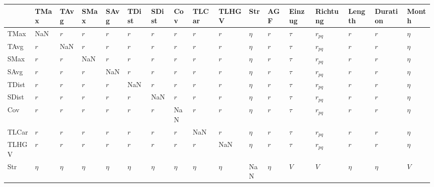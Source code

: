 \begin{tabular}{lllllllllllllllll}
\toprule
{} &      TMax &      TAvg &      SMax &      SAvg &     TDist &     SDist &       Cov &     TLCar &     TLHGV &     Str &       AGF &  Einzug &  Richtung &    Length &  Duration &   Month \\
\midrule
TMax     &       NaN &       $r$ &       $r$ &       $r$ &       $r$ &       $r$ &       $r$ &       $r$ &       $r$ &  $\eta$ &       $r$ &  $\tau$ &  $r_{pq}$ &       $r$ &       $r$ &  $\eta$ \\
TAvg     &       $r$ &       NaN &       $r$ &       $r$ &       $r$ &       $r$ &       $r$ &       $r$ &       $r$ &  $\eta$ &       $r$ &  $\tau$ &  $r_{pq}$ &       $r$ &       $r$ &  $\eta$ \\
SMax     &       $r$ &       $r$ &       NaN &       $r$ &       $r$ &       $r$ &       $r$ &       $r$ &       $r$ &  $\eta$ &       $r$ &  $\tau$ &  $r_{pq}$ &       $r$ &       $r$ &  $\eta$ \\
SAvg     &       $r$ &       $r$ &       $r$ &       NaN &       $r$ &       $r$ &       $r$ &       $r$ &       $r$ &  $\eta$ &       $r$ &  $\tau$ &  $r_{pq}$ &       $r$ &       $r$ &  $\eta$ \\
TDist    &       $r$ &       $r$ &       $r$ &       $r$ &       NaN &       $r$ &       $r$ &       $r$ &       $r$ &  $\eta$ &       $r$ &  $\tau$ &  $r_{pq}$ &       $r$ &       $r$ &  $\eta$ \\
SDist    &       $r$ &       $r$ &       $r$ &       $r$ &       $r$ &       NaN &       $r$ &       $r$ &       $r$ &  $\eta$ &       $r$ &  $\tau$ &  $r_{pq}$ &       $r$ &       $r$ &  $\eta$ \\
Cov      &       $r$ &       $r$ &       $r$ &       $r$ &       $r$ &       $r$ &       NaN &       $r$ &       $r$ &  $\eta$ &       $r$ &  $\tau$ &  $r_{pq}$ &       $r$ &       $r$ &  $\eta$ \\
TLCar    &       $r$ &       $r$ &       $r$ &       $r$ &       $r$ &       $r$ &       $r$ &       NaN &       $r$ &  $\eta$ &       $r$ &  $\tau$ &  $r_{pq}$ &       $r$ &       $r$ &  $\eta$ \\
TLHGV    &       $r$ &       $r$ &       $r$ &       $r$ &       $r$ &       $r$ &       $r$ &       $r$ &       NaN &  $\eta$ &       $r$ &  $\tau$ &  $r_{pq}$ &       $r$ &       $r$ &  $\eta$ \\
Str      &    $\eta$ &    $\eta$ &    $\eta$ &    $\eta$ &    $\eta$ &    $\eta$ &    $\eta$ &    $\eta$ &    $\eta$ &     NaN &    $\eta$ &     $V$ &       $V$ &    $\eta$ &    $\eta$ &     $V$ \\

\end{tabular}
